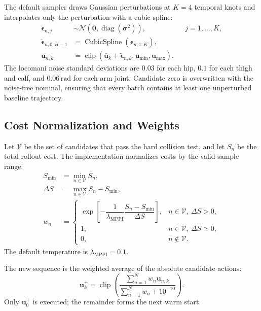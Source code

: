 \documentclass[11pt,a4paper]{article}
\newcommand{\clip}{\operatorname{clip}}
\newcommand{\diag}{\operatorname{diag}}
\begin{document}
The default sampler draws Gaussian perturbations at $K=4$ temporal knots and
interpolates only the perturbation with a cubic spline:
\begin{align}
  \bm{\epsilon}_{n,j}
  &\sim\mathcal{N}(\bm{0},\diag(\bm{\sigma}^2)),
  &&j=1,\ldots,K,\\
  \tilde{\bm{\epsilon}}_{n,0:H-1}
  &=\operatorname{CubicSpline}
  (\bm{\epsilon}_{n,1:K}),\\
  \bm{u}_{n,k}
  &=\clip\left(
    \bar{\bm{u}}_k+\tilde{\bm{\epsilon}}_{n,k},
    \bm{u}_{\min},\bm{u}_{\max}
  \right).
\end{align}
The locomani noise standard deviations are $0.03$ for each hip, $0.1$ for
each thigh and calf, and $0.06\,\mathrm{rad}$ for each arm joint. Candidate
zero is overwritten with the noise-free nominal, ensuring that every batch
contains at least one unperturbed baseline trajectory.

\subsection{Cost Normalization and Weights}

Let $\mathcal{V}$ be the set of candidates that pass the hard collision test,
and let $S_n$ be the total rollout cost. The implementation normalizes costs by
the valid-sample range:
\begin{align}
  S_{\min}&=\min_{n\in\mathcal{V}}S_n,\\
  \Delta S&=\max_{n\in\mathcal{V}}S_n-S_{\min},\\
  w_n&=
  \begin{cases}
    \exp\!\left[
      -\dfrac{1}{\lambda_{\mathrm{MPPI}}}
      \dfrac{S_n-S_{\min}}{\Delta S}
    \right],
    &n\in\mathcal{V},\ \Delta S>0,\\
    1,&n\in\mathcal{V},\ \Delta S\simeq0,\\
    0,&n\notin\mathcal{V}.
  \end{cases}
\end{align}
The default temperature is $\lambda_{\mathrm{MPPI}}=0.1$.

The new sequence is the weighted average of the absolute candidate actions:
\begin{equation}
  \boxed{
  \bm{u}^{+}_k=
  \clip\left(
    \frac{\sum_{n=1}^{N}w_n\bm{u}_{n,k}}
         {\sum_{n=1}^{N}w_n+10^{-10}}
  \right).
  }
\end{equation}
Only $\bm{u}^{+}_0$ is executed; the remainder forms the next warm start.
\end{document}
